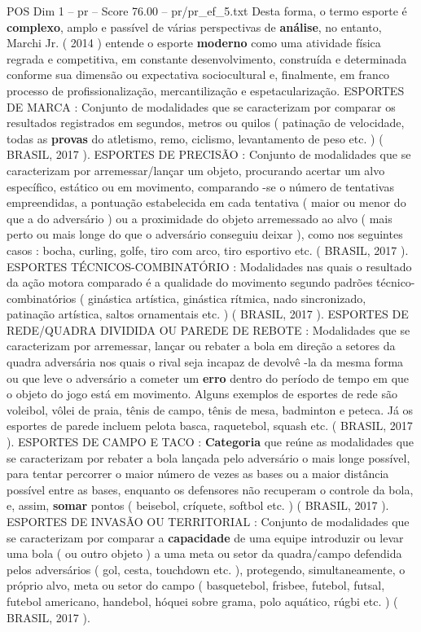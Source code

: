 \begin{textsample}{POS Dim 1 – pr – Score 76.00 – pr/pr\_ef\_5.txt}
Desta forma, o termo esporte é \textbf{complexo}, amplo e passível de várias perspectivas de \textbf{análise}, no entanto, Marchi Jr. ( 2014 ) entende o esporte \textbf{moderno} como uma atividade física regrada e competitiva, em constante desenvolvimento, construída e determinada conforme sua dimensão ou expectativa sociocultural e, finalmente, em franco processo de profissionalização, mercantilização e espetacularização.
ESPORTES DE MARCA : Conjunto de modalidades que se caracterizam por comparar os resultados registrados em segundos, metros ou quilos ( patinação de velocidade, todas as \textbf{provas} do atletismo, remo, ciclismo, levantamento de peso etc. ) ( BRASIL, 2017 ).
ESPORTES DE PRECISÃO : Conjunto de modalidades que se caracterizam por arremessar/lançar um objeto, procurando acertar um alvo específico, estático ou em movimento, comparando -se o número de tentativas empreendidas, a pontuação estabelecida em cada tentativa ( maior ou menor do que a do adversário ) ou a proximidade do objeto arremessado ao alvo ( mais perto ou mais longe do que o adversário conseguiu deixar ), como nos seguintes casos : bocha, curling, golfe, tiro com arco, tiro esportivo etc. ( BRASIL, 2017 ).
ESPORTES TÉCNICOS-COMBINATÓRIO : Modalidades nas quais o resultado da ação motora comparado é a qualidade do movimento segundo padrões técnico-combinatórios ( ginástica artística, ginástica rítmica, nado sincronizado, patinação artística, saltos ornamentais etc. ) ( BRASIL, 2017 ).
ESPORTES DE REDE/QUADRA DIVIDIDA OU PAREDE DE REBOTE : Modalidades que se caracterizam por arremessar, lançar ou rebater a bola em direção a setores da quadra adversária nos quais o rival seja incapaz de devolvê -la da mesma forma ou que leve o adversário a cometer um \textbf{erro} dentro do período de tempo em que o objeto do jogo está em movimento.
Alguns exemplos de esportes de rede são voleibol, vôlei de praia, tênis de campo, tênis de mesa, badminton e peteca.
Já os esportes de parede incluem pelota basca, raquetebol, squash etc. ( BRASIL, 2017 ).
ESPORTES DE CAMPO E TACO : \textbf{Categoria} que reúne as modalidades que se caracterizam por rebater a bola lançada pelo adversário o mais longe possível, para tentar percorrer o maior número de vezes as bases ou a maior distância possível entre as bases, enquanto os defensores não recuperam o controle da bola, e, assim, \textbf{somar} pontos ( beisebol, críquete, softbol etc. ) ( BRASIL, 2017 ).
ESPORTES DE INVASÃO OU TERRITORIAL : Conjunto de modalidades que se caracterizam por comparar a \textbf{capacidade} de uma equipe introduzir ou levar uma bola ( ou outro objeto ) a uma meta ou setor da quadra/campo defendida pelos adversários ( gol, cesta, touchdown etc. ), protegendo, simultaneamente, o próprio alvo, meta ou setor do campo ( basquetebol, frisbee, futebol, futsal, futebol americano, handebol, hóquei sobre grama, polo aquático, rúgbi etc. ) ( BRASIL, 2017 ).

\end{textsample}
